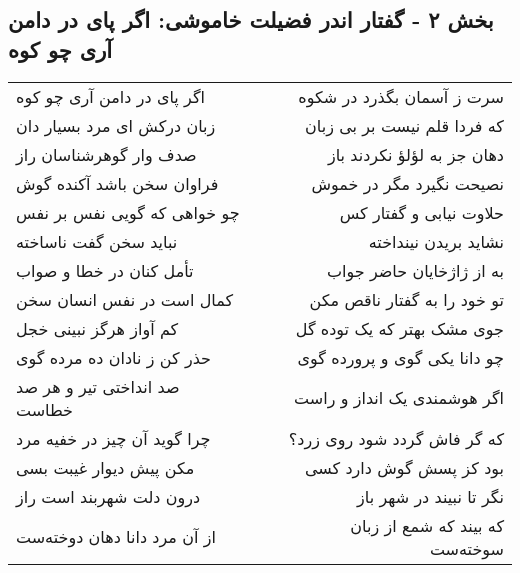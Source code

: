 \begin{center}
\section*{بخش ۲ - گفتار اندر فضیلت خاموشی: اگر پای در دامن آری چو کوه}
\label{sec:002}
\begin{longtable}{l p{0.5cm} r}
اگر پای در دامن آری چو کوه
&&
سرت ز آسمان بگذرد در شکوه
\\
زبان درکش ای مرد بسیار دان
&&
که فردا قلم نیست بر بی زبان
\\
صدف وار گوهرشناسان راز
&&
دهان جز به لؤلؤ نکردند باز
\\
فراوان سخن باشد آکنده گوش
&&
نصیحت نگیرد مگر در خموش
\\
چو خواهی که گویی نفس بر نفس
&&
حلاوت نیابی و گفتار کس
\\
نباید سخن گفت ناساخته
&&
نشاید بریدن نینداخته
\\
تأمل کنان در خطا و صواب
&&
به از ژاژخایان حاضر جواب
\\
کمال است در نفس انسان سخن
&&
تو خود را به گفتار ناقص مکن
\\
کم آواز هرگز نبینی خجل
&&
جوی مشک بهتر که یک توده گل
\\
حذر کن ز نادان ده مرده گوی
&&
چو دانا یکی گوی و پرورده گوی
\\
صد انداختی تیر و هر صد خطاست
&&
اگر هوشمندی یک انداز و راست
\\
چرا گوید آن چیز در خفیه مرد
&&
که گر فاش گردد شود روی زرد؟
\\
مکن پیش دیوار غیبت بسی
&&
بود کز پسش گوش دارد کسی
\\
درون دلت شهربند است راز
&&
نگر تا نبیند در شهر باز
\\
از آن مرد دانا دهان دوخته‌ست
&&
که بیند که شمع از زبان سوخته‌ست
\\
\end{longtable}
\end{center}
